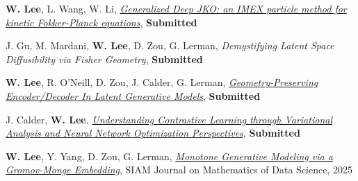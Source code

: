 

\begin{cvparagraph}

\vspace{0.5cm}
\begin{cvitems}
  \item \textbf{W. Lee}, L. Wang, W. Li, \href{}{\textit{Generalized Deep JKO: an IMEX particle method for kinetic Fokker-Planck equations}}, \textbf{Submitted}
  \item J. Gu, M. Mardani, \textbf{W. Lee}, D. Zou, G. Lerman, \textit{Demystifying Latent Space Diffusibility via Fisher Geometry}, \textbf{Submitted}
  \item \textbf{W. Lee}, R. O'Neill, D. Zou, J. Calder, G. Lerman, \href{https://arxiv.org/abs/2501.09876}{\textit{Geometry-Preserving Encoder/Decoder In Latent Generative Models}}, \textbf{Submitted} %
  \item J. Calder, \textbf{W. Lee}, \href{https://openreview.net/pdf?id=qjoDJjVZxB}{\textit{Understanding Contrastive Learning through Variational Analysis and Neural Network Optimization Perspectives}}, \textbf{Submitted}
  \item \textbf{W. Lee}, Y. Yang, D. Zou, G. Lerman, \href{https://arxiv.org/abs/2311.01375}{\textit{Monotone Generative Modeling via a Gromov-Monge Embedding}}, SIAM Journal on Mathematics of Data Science, 2025

\end{cvitems}
\end{cvparagraph}
